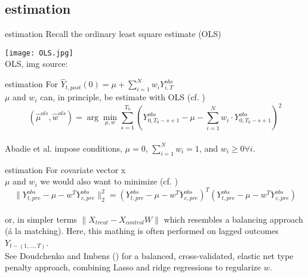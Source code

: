 \documentclass[aspectratio=169]{beamer}
\begin{document}
	\subsection{estimation}
		\begin{frame}{estimation}
			Recall the ordinary least square estimate (OLS)
		\begin{center}
			\texttt{[image: OLS.jpg]}
				\\\tiny{OLS, img source: \href{https://serokell.io/blog/regression-analysis-overview}{\underline{}}}
		\end{center}
		\end{frame}

		\begin{frame}{estimation}
			For
			\begin{math}
				\hat Y_{t,post}(0)  = \mu + \sum_{i=1}^{N}{w_iY_{i,T}^{obs}}
			\end{math}
			\\ \vspace*{.5cm}
			$\mu$ and $w_i$ can, in principle, be estimate with OLS (cf. \cite{Doudchenko2016})
			\begin{equation}
				(\hat{\mu}^{ols}, \hat{w}^{ols}) = \arg\min_{\mu, w} \sum_{s=1}^{T_0}\left({Y_{0,T_0-s+1}^{obs} - \mu - \sum_{i=1}^{N}{w_i} \cdot Y_{0,T_0-s+1}^{obs} }\right)^2
			\end{equation}
			\\ \vspace*{.25cm}
			\onslide<2> Abadie et al. \citeyear{Abadie2010} impose conditions, $\mu= 0$, $\sum_{i=1}^{N}{w_i}=1$, and $w_i \geq 0{ }\forall i$.
		\end{frame}

		\begin{frame}{estimation}
			For covariate vector {x}
			\\ \vspace*{.5cm}
			$\mu$ and $w_i$ we would also want to minimize (cf. \cite{Doudchenko2016})
			\begin{equation}
				\| Y_{t,pre}^{obs} - \mu - w^T Y_{c,pre}^{obs} \|_2^2 = \left( Y_{t,pre}^{obs} - \mu - w^T Y_{c,pre}^{obs} \right)^T \left( Y_{t,pre}^{obs} - \mu - w^T Y_{c,pre}^{obs} \right)
			\end{equation}
			\\ \vspace*{.25cm}
			or, in simpler terms
			\begin{math}
				\| X_{treat} - X_{control} W \|
			\end{math}
			which resembles a balancing approach (á la matching). Here, this mathing is often performed on lagged outcomes $Y_{t-(1,...,T)}$.
			\\ \vspace*{.25cm}
			\onslide<3> See Doudchenko and Imbens (\citeyear{Doudchenko2016}) for a balanced, cross-validated, elastic net type penalty approach, combining Lasso and ridge regressions to regularize $w$.
		\end{frame}
\end{document}
